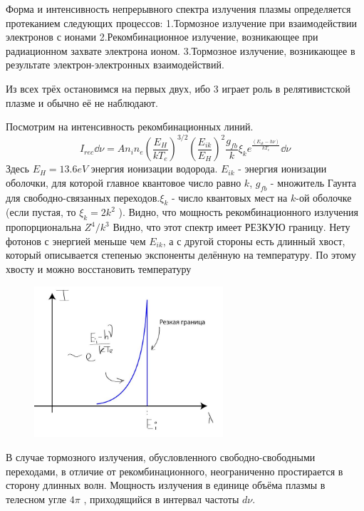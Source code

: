 \documentclass[10pt, a4paper]{article}
\begin{document}
Форма и интенсивность непрерывного спектра излучения плазмы определяется протеканием следующих процессов:
1.Тормозное излучение при взаимодействии электронов с ионами
2.Рекомбинационное излучение, возникающее при радиационном захвате электрона ионом.
3.Тормозное излучение, возникающее в результате электрон-электронных взаимодействий.

Из всех трёх остановимся на первых двух, ибо 3 играет роль в релятивистской плазме и обычно её не наблюдают.

Посмотрим на интенсивность рекомбинационных линий.
\begin{equation}
	I_{rec} \dd\nu = A n_i n_e (\frac{E_H}{kT_e})^{3/2} (\frac{E_{ik}}{E_H})^{2} \frac{g_{fb}}{k} \xi_k e^{\frac{(E_{ik}-h \nu)}{kT_e}} \dd\nu 
\end{equation}
Здесь $E_H = 13.6 eV$ энергия ионизации водорода. $E_{ik}$ - энергия ионизации оболочки, для которой главное квантовое число равно $k$, $g_{fb}$ - множитель Гаунта для свободно-связанных переходов.$ \xi_k$ - число квантовых мест на $k$-ой оболочке (если пустая, то $ \xi_k = 2k^{2}$ ). 
Видно, что мощность рекомбинационного излучения пропорциональна $Z^{4}/k^3$
Видно, что этот спектр имеет РЕЗКУЮ границу. Нету фотонов с энергией меньше чем $E_{ik}$, а с другой стороны есть длинный хвост, который описывается степенью экспоненты делённую на температуру. По этому хвосту и можно восстановить температуру

\begin{figure}[ht]
	\begin{center}
		\includegraphics[width=70mm]{Intencity_recomb.JPG}
	\end{center}
\end{figure}

В случае тормозного излучения, обусловленного свободно-свободными переходами, в отличие от рекомбинационного, неограниченно простирается в сторону длинных волн. Мощность излучения в единице объёма плазмы в телесном угле $4 \pi$ , приходящийся в интервал частоты $d\nu$.
\end{document}
